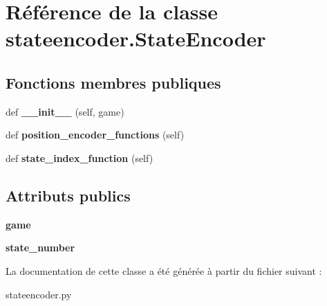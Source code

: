 \hypertarget{classstateencoder_1_1StateEncoder}{}\section{Référence de la classe stateencoder.\+State\+Encoder}
\label{classstateencoder_1_1StateEncoder}
\subsection*{Fonctions membres publiques}
\begin{DoxyCompactItemize}
\item 
\mbox{\label{classstateencoder_1_1StateEncoder_a503f0aa0c6cfae6f022fd79fd2bfa152}} 
def {\bfseries \+\_\+\+\_\+init\+\_\+\+\_\+} (self, game)
\item 
\mbox{\label{classstateencoder_1_1StateEncoder_aff259f1e3d3e79919557b75aac758054}} 
def {\bfseries position\+\_\+encoder\+\_\+functions} (self)
\item 
\mbox{\label{classstateencoder_1_1StateEncoder_a1ccde118fbd3eccb9dde2610533c9dae}} 
def {\bfseries state\+\_\+index\+\_\+function} (self)
\end{DoxyCompactItemize}
\subsection*{Attributs publics}
\begin{DoxyCompactItemize}
\item 
\mbox{\label{classstateencoder_1_1StateEncoder_af55cb60af3c00cb2ff576163046fb672}} 
{\bfseries game}
\item 
\mbox{\label{classstateencoder_1_1StateEncoder_a0db3da25383e1889ac047aedad6aee8f}} 
{\bfseries state\+\_\+number}
\end{DoxyCompactItemize}


La documentation de cette classe a été générée à partir du fichier suivant \+:\begin{DoxyCompactItemize}
\item 
stateencoder.\+py\end{DoxyCompactItemize}
